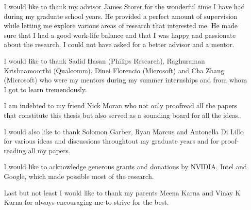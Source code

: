 I would like to thank my advisor James Storer for the wonderful time I have had during my graduate school years. He provided a perfect amount of supervision while letting me explore various areas of research that interested me.
He made sure that I had a good work-life balance and that I was happy and passionate about the research.
I could not have asked for a better advisor and a mentor.

I would like to thank Sadid Hasan (Philips Research), Raghuraman Krishnamoorthi (Qualcomm), Dinei Florencio (Microsoft) and Cha Zhang (Microsoft) who were my mentors during my summer internships and from whom I got to learn tremendously.  

I am indebted to my friend Nick Moran who not only proofread all the papers that constitute this thesis but also served as a sounding board for all the ideas.

I would also like to thank Solomon Garber, Ryan Marcus and Antonella Di Lillo for various ideas and discussions throughtout my graduate years and for proof-reading all my papers.

I would like to acknowledge generous grants and donations by NVIDIA, Intel and Google, which made possible most of the research.

Last but not least I would like to thank my parents Meena Karna and Vinay K Karna for always encouraging me to strive for the best.
